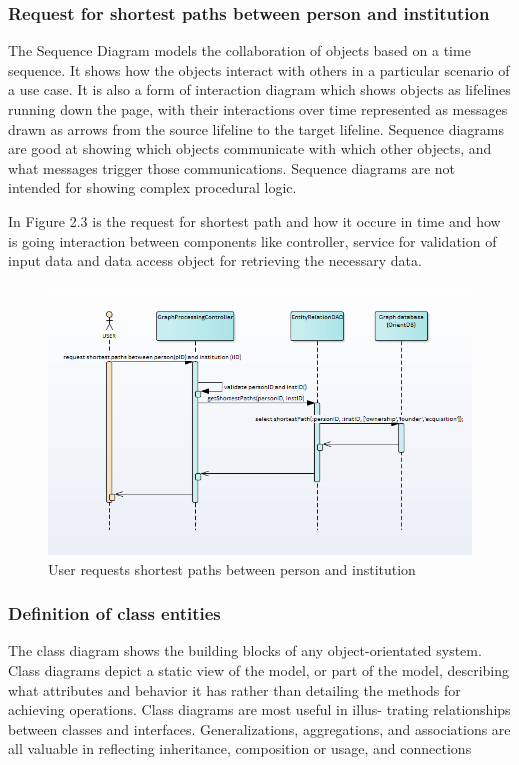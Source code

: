 \documentclass[12pt,a4paper,titlepage]{article}
\begin{document}
\subsubsection{Request for shortest paths between person and institution}

The Sequence Diagram models the collaboration of objects based on a time sequence. It shows
how the objects interact with others in a particular scenario of a use case. It is also a form of
interaction diagram which shows objects as lifelines running down the page, with their interactions
over time represented as messages drawn as arrows from the source lifeline to the target lifeline.
Sequence diagrams are good at showing which objects communicate with which other objects, and
what messages trigger those communications. Sequence diagrams are not intended for showing
complex procedural logic.

In Figure 2.3 is the request for shortest path and how it occure in time and how is going interaction between components like controller, service for validation of input data and data access object for retrieving the necessary data.

\begin{figure}[!ht]
	\renewcommand\thefigure{2.3} %
	\centering 
	\includegraphics[width=17cm]{seq.png} 
	\caption{ User requests shortest paths between person and institution }\label{fig}
	\end{figure}


\subsubsection{Definition of class entities}
The class diagram shows the building blocks of any object-orientated system. Class diagrams
depict a static view of the model, or part of the model, describing what attributes and behavior it has
rather than detailing the methods for achieving operations. Class diagrams are most useful in illus-
trating relationships between classes and interfaces. Generalizations, aggregations, and associations
are all valuable in reflecting inheritance, composition or usage, and connections\\
\end{document}
